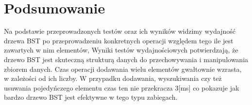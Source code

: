 \documentclass{article}
\begin{document}
\section*{Podsumowanie}
Na podstawie przeprowadzonych testów oraz ich wyników widzimy wydajność drzewa BST po przeprowadzeniu konkretnych operacji względem tego ile jest zawartych w nim elementów, Wyniki testów wydajnościowych potwierdzają, że drzewo BST jest skuteczną strukturą danych do przechowywania i manipulowania zbiorem danych. Czas operacji dodawania wielu elementów gwałtownie wzrasta, w zależości od ich liczby. W przypadku dodawania, wyszukiwania czy też usuwania pojedyńczego elementu czas ten nie przekracza 3[ms] co pokazuje jak bardzo drzewo BST jest efektywne w tego typu zabiegach. 
\end{document}
